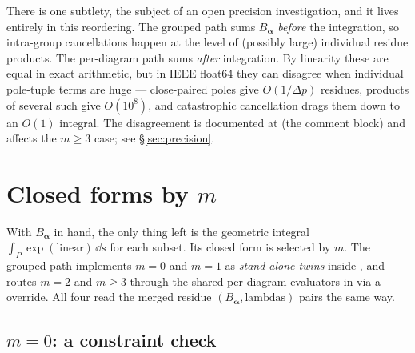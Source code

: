 \begin{gotcha}
There is one subtlety, the subject of an open precision investigation, and it
lives entirely in this reordering. The grouped path sums $B_{\bm\alpha}$
\emph{before} the integration, so intra-group cancellations happen at the level
of (possibly large) individual residue products. The per-diagram path sums
\emph{after} integration. By linearity these are equal in exact arithmetic, but
in IEEE float64 they can disagree when individual pole-tuple terms are huge ---
close-paired poles give $O(1/\Delta p)$ residues, products of several such give
$O(10^8)$, and catastrophic cancellation drags them down to an $O(1)$ integral.
The disagreement is documented at  (the
 comment block) and affects the $m\ge 3$
case; see \S\ref{sec:precision}.
\end{gotcha}

\section{Closed forms by \texorpdfstring{$m$}{m}}\label{sec:closedforms}

With $B_{\bm\alpha}$ in hand, the only thing left is the geometric integral
$\int_P \exp(\text{linear})\,\dd s$ for each subset. Its closed form is selected
by $m$. The grouped path implements $m=0$ and $m=1$ as \emph{stand-alone twins}
inside , and routes $m=2$ and $m\ge 3$ through the
shared per-diagram evaluators in  via a
 override. All four read the merged residue
$(B_{\bm\alpha}, \text{lambdas})$ pairs the same way.

\subsection{$m=0$: a constraint check}

